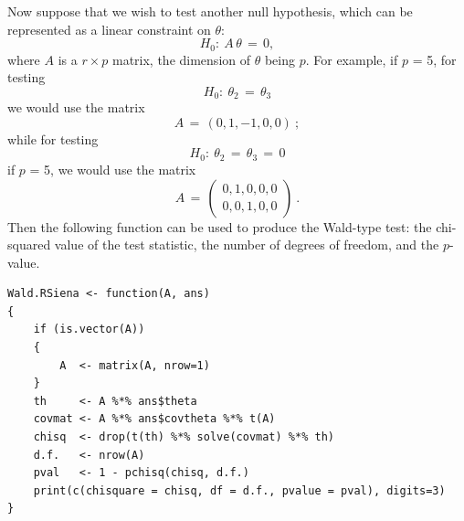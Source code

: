 \documentclass[a4paper,fleqn,11pt]{article}
\newcommand{\+}{\, + \,}
\begin{document}
Now suppose that we wish to test another null hypothesis,
which can be represented as a linear constraint on $\theta$:
\[
H_0 : \ A\,\theta \,=\, 0 ,
\]
where $A$ is a $r \times p$ matrix, the dimension of $\theta$ being $p$.
For example, if $p$ = 5, for testing
\[
H_0 : \ \theta_2 \,=\, \theta_3
\]
we would use the matrix
\[
   A \,=\, (0, 1, -1, 0, 0) \ ;
\]
while for testing
\[
H_0 : \ \theta_2 \,=\, \theta_3 \,=\, 0
\]
if $p$ = 5, we would use the matrix
\[
   A \,=\, \left( \begin{array}{l} 0, 1, 0, 0, 0 \\
                                   0, 0, 1, 0, 0
                  \end{array} \right) \ .
\]
Then the following function can be used to produce
the Wald-type test: the chi-squared value of the
test statistic, the number of degrees of freedom, and the $p$-value.
\begin{verbatim}
Wald.RSiena <- function(A, ans)
{
    if (is.vector(A))
    {
        A  <- matrix(A, nrow=1)
    }
    th     <- A %*% ans$theta
    covmat <- A %*% ans$covtheta %*% t(A)
    chisq  <- drop(t(th) %*% solve(covmat) %*% th)
    d.f.   <- nrow(A)
    pval   <- 1 - pchisq(chisq, d.f.)
    print(c(chisquare = chisq, df = d.f., pvalue = pval), digits=3)
}
\end{verbatim}
\end{document}
